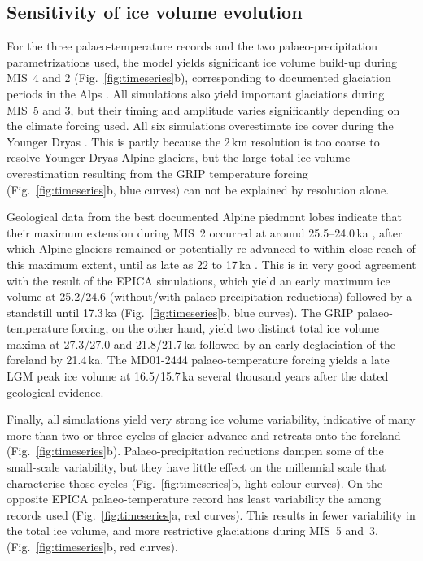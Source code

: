 \documentclass[tc, manuscript]{copernicus}
\begin{document}
\subsection{Sensitivity of ice volume evolution}
\label{sec:timeseries}

    For the three palaeo-temperature records and the two palaeo-precipitation
    parametrizations used, the model yields significant ice volume build-up
    during MIS~4 and 2 (Fig.~\ref{fig:timeseries}b), corresponding to documented
    glaciation periods in the Alps \citep{Preusser.2004, Ivy-Ochs.etal.2008}.
    All simulations also yield important glaciations during MIS~5 and 3, but
    their timing and amplitude varies significantly depending on the climate
    forcing used. All six simulations overestimate
    ice cover during the Younger Dryas \citep[cf. e.g.,][]{Ivy-Ochs.etal.2009}.
    This is partly because the 2\,km resolution is too coarse to resolve
    Younger Dryas Alpine glaciers, but the large total ice volume
    overestimation resulting from the GRIP temperature forcing
    (Fig.~\ref{fig:timeseries}b, blue curves) can not be explained by
    resolution alone.

    Geological data from the best documented Alpine piedmont lobes indicate
    that their maximum extension during MIS~2 occurred at around 25.5--24.0\,ka
    \citep{Monegato.etal.2017}, after which Alpine glaciers remained or
    potentially re-advanced to within close reach of this maximum extent, until
    as late as 22 to 17\,ka \citep[Fig.~5]{Wirsig.etal.2016}. This is in very
    good agreement with the result of the EPICA simulations, which yield an
    early maximum ice volume at 25.2/24.6 (without/with palaeo-precipitation
    reductions) followed by a standstill until 17.3\,ka
    (Fig.~\ref{fig:timeseries}b, blue curves). The GRIP palaeo-temperature
    forcing, on the other hand, yield two distinct total ice volume maxima
    at 27.3/27.0 and 21.8/21.7\,ka followed by an early deglaciation of the
    foreland by 21.4\,ka. The MD01-2444 palaeo-temperature forcing yields
    a late LGM peak ice volume at 16.5/15.7\,ka several thousand years after
    the dated geological evidence.

    Finally, all simulations yield very strong ice volume
    variability, indicative of many more than two or three cycles of glacier
    advance and retreats onto the foreland (Fig.~\ref{fig:timeseries}b).
    Palaeo-precipitation reductions dampen some of the small-scale variability,
    but they have little effect on the millennial scale that characterise those
    cycles (Fig.~\ref{fig:timeseries}b, light colour curves). On the opposite
    EPICA palaeo-temperature record has least variability the among records
    used (Fig.~\ref{fig:timeseries}a, red curves). This results in fewer
    variability in the total ice volume, and more restrictive glaciations
    during MIS~5 and~3, (Fig.~\ref{fig:timeseries}b, red curves).
\end{document}
